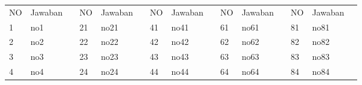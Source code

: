 \documentclass[12pt]{article}
\begin{document}
\begin{table}[]
\centering
\vspace{-2cm}
\label{my-label}
\begin{tabular}{lllllllllllllll}
\cline{1-2} \cline{4-5} \cline{7-8} \cline{10-11} \cline{13-14}


\multicolumn{1}{|l|}{NO} & 
\multicolumn{1}{l|}{Jawaban} & 
\multicolumn{1}{l|}{} & 
\multicolumn{1}{l|}{NO} & 
\multicolumn{1}{l|}{Jawaban} & 
\multicolumn{1}{l|}{} & 
\multicolumn{1}{l|}{NO} & 
\multicolumn{1}{l|}{Jawaban} & 
\multicolumn{1}{l|}{} & 
\multicolumn{1}{l|}{NO} & 
\multicolumn{1}{l|}{Jawaban} & 
\multicolumn{1}{l|}{} & 
\multicolumn{1}{l|}{NO}  & 
\multicolumn{1}{l|}{Jawaban} &  \\ \cline{1-2} \cline{4-5} \cline{7-8} \cline{10-11} \cline{13-14}


\multicolumn{1}{|l|}{1}  & 
\multicolumn{1}{l|}{no1}        & 
\multicolumn{1}{l|}{} & 
\multicolumn{1}{l|}{21} & 
\multicolumn{1}{l|}{no21}        & 
\multicolumn{1}{l|}{} & 
\multicolumn{1}{l|}{41} & 
\multicolumn{1}{l|}{no41}        & 
\multicolumn{1}{l|}{} & 
\multicolumn{1}{l|}{61} & 
\multicolumn{1}{l|}{no61}        & 
\multicolumn{1}{l|}{} & 
\multicolumn{1}{l|}{81}  & 
\multicolumn{1}{l|}{no81}        &  \\ \cline{1-2} \cline{4-5} \cline{7-8} \cline{10-11} \cline{13-14}


\multicolumn{1}{|l|}{2}  & 
\multicolumn{1}{l|}{no2}        & 
\multicolumn{1}{l|}{} & 
\multicolumn{1}{l|}{22} & 
\multicolumn{1}{l|}{no22}        & 
\multicolumn{1}{l|}{} & 
\multicolumn{1}{l|}{42} & 
\multicolumn{1}{l|}{no42}        & 
\multicolumn{1}{l|}{} & 
\multicolumn{1}{l|}{62} & 
\multicolumn{1}{l|}{no62}        & 
\multicolumn{1}{l|}{} & 
\multicolumn{1}{l|}{82}  & 
\multicolumn{1}{l|}{no82}        &  \\ \cline{1-2} \cline{4-5} \cline{7-8} \cline{10-11} \cline{13-14}


\multicolumn{1}{|l|}{3}  & 
\multicolumn{1}{l|}{no3}        & 
\multicolumn{1}{l|}{} & 
\multicolumn{1}{l|}{23} & 
\multicolumn{1}{l|}{no23}        & 
\multicolumn{1}{l|}{} & 
\multicolumn{1}{l|}{43} & 
\multicolumn{1}{l|}{no43}        & 
\multicolumn{1}{l|}{} & 
\multicolumn{1}{l|}{63} & 
\multicolumn{1}{l|}{no63}        & 
\multicolumn{1}{l|}{} & 
\multicolumn{1}{l|}{83}  & 
\multicolumn{1}{l|}{no83}        &  \\ \cline{1-2} \cline{4-5} \cline{7-8} \cline{10-11} \cline{13-14}


\multicolumn{1}{|l|}{4}  & 
\multicolumn{1}{l|}{no4}        & 
\multicolumn{1}{l|}{} & 
\multicolumn{1}{l|}{24} & 
\multicolumn{1}{l|}{no24}        & 
\multicolumn{1}{l|}{} & 
\multicolumn{1}{l|}{44} & 
\multicolumn{1}{l|}{no44}        & 
\multicolumn{1}{l|}{} & 
\multicolumn{1}{l|}{64} & 
\multicolumn{1}{l|}{no64}        & 
\multicolumn{1}{l|}{} & 
\multicolumn{1}{l|}{84}  & 
\multicolumn{1}{l|}{no84}        &  \\ \cline{1-2} \cline{4-5} \cline{7-8} \cline{10-11} \cline{13-14}



\end{tabular}
\end{table}
\end{document}
